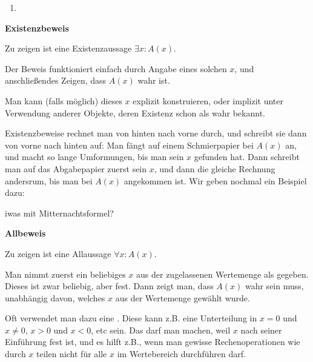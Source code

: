 \begin{example}
    \begin{enumerate}
        \item 
    \end{enumerate}
\end{example}

\begin{shadedbox}
    \label{proof-of-existence}
    \textbf{Existenzbeweis}

    Zu zeigen ist eine Existenzaussage $\exists x\!: A(x)$.

    Der Beweis funktioniert einfach durch Angabe eines solchen $x$, und anschließendes Zeigen, dass $A(x)$ wahr ist.

    Man kann (falls möglich) dieses $x$ explizit konstruieren, oder implizit unter Verwendung anderer Objekte, deren Existenz schon als wahr bekannt.\footnotemark
\end{shadedbox}

Existenzbeweise rechnet man von hinten nach vorne durch, und schreibt sie dann von vorne nach hinten auf: Man fängt auf einem Schmierpapier bei $A(x)$ an, und macht so lange Umformungen, bis man sein $x$ gefunden hat. Dann schreibt man auf das Abgabepapier zuerst sein $x$, und dann die gleiche Rechnung andersrum, bis man bei $A(x)$ angekommen ist. Wir geben nochmal ein Beispiel dazu:

\begin{example}
    iwas mit Mitternachtsformel?
\end{example}

\begin{shadedbox}
    \textbf{Allbeweis}
    
    Zu zeigen ist eine Allaussage $\forall x\!: A(x)$.

    Man nimmt zuerst ein beliebiges $x$ aus der zugelassenen Wertemenge als gegeben. Dieses ist zwar beliebig, aber fest. Dann zeigt man, dass $A(x)$ wahr sein muss, unabhängig davon, welches $x$ aus der Wertemenge gewählt wurde.

    Oft verwendet man dazu eine . Diese kann z.B. eine Unterteilung in $x = 0$ und $x \neq 0$, $x > 0$ und $x < 0$, etc sein. Das darf man machen, weil $x$ nach seiner Einführung fest ist, und es hilft z.B., wenn man gewisse Rechenoperationen wie durch $x$ teilen nicht für alle $x$ im Wertebereich durchführen darf.
\end{shadedbox}

